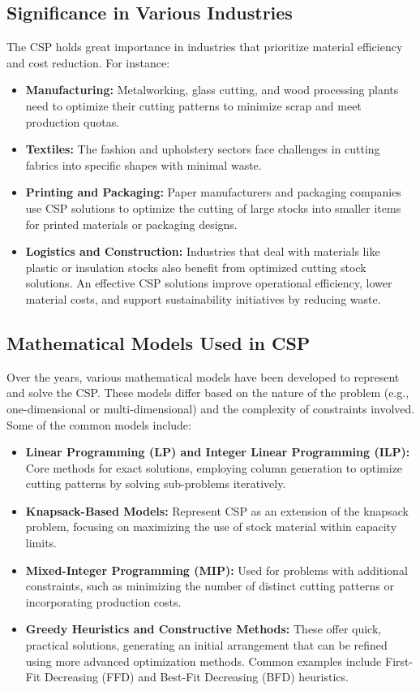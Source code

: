 \documentclass[a4paper]{article}
\begin{document}
\subsection{Significance in Various Industries}
The CSP holds great importance in industries that prioritize material efficiency and cost reduction. For instance:
\begin{itemize}
    \item \textbf{Manufacturing:}  Metalworking, glass cutting, and wood processing plants need to optimize their cutting patterns to minimize scrap and meet production quotas.
    \item \textbf{Textiles:}  The fashion and upholstery sectors face challenges in cutting fabrics into specific shapes with minimal waste.
    \item \textbf{Printing and Packaging:}  Paper manufacturers and packaging companies use CSP solutions to optimize the cutting of large stocks into smaller items for printed materials or packaging designs.
    \item \textbf{Logistics and Construction:}  Industries that deal with materials like plastic or insulation stocks also benefit from optimized cutting stock solutions.
An effective CSP solutions improve operational efficiency, lower material costs, and support sustainability initiatives by reducing waste.
\end{itemize}
\subsection{Mathematical Models Used in CSP}
Over the years, various mathematical models have been developed to represent and solve the CSP. These models differ based on the nature of the problem (e.g., one-dimensional or multi-dimensional) and the complexity of constraints involved. Some of the common models include:
\begin{itemize}
    \item \textbf{Linear Programming (LP) and Integer Linear Programming (ILP):}  Core methods for exact solutions, employing column generation to optimize cutting patterns by solving sub-problems iteratively.
    \item \textbf{Knapsack-Based Models:} Represent CSP as an extension of the knapsack problem, focusing on maximizing the use of stock material within capacity limits.
    \item \textbf{Mixed-Integer Programming (MIP):}  Used for problems with additional constraints, such as minimizing the number of distinct cutting patterns or incorporating production costs.
    \item \textbf{Greedy Heuristics and Constructive Methods:}  These offer quick, practical solutions, generating an initial arrangement that can be refined using more advanced optimization methods. Common examples include First-Fit Decreasing (FFD) and Best-Fit Decreasing (BFD) heuristics.
\end{itemize}
\end{document}
